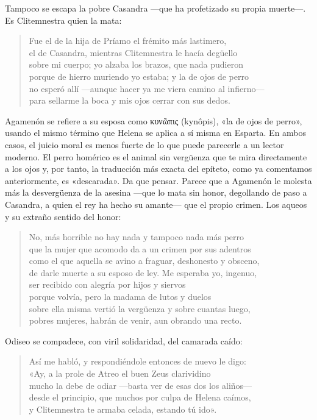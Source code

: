\documentclass[11pt,a4paper]{article}
\newcommand{\gr}[1]{\foreignlanguage{greek}{#1}}
\begin{document}
Tampoco se escapa la pobre Casandra ---que ha profetizado su propia muerte---. Es Clitemnestra quien la mata:

\begin{verse}
Fue el de la hija de Príamo el frémito más lastimero,\\
el de Casandra, mientras Clitemnestra le hacía degüello\\
sobre mi cuerpo; yo alzaba los brazos, que nada pudieron\\
porque de hierro muriendo yo estaba; y la de ojos de perro\\
no esperó allí ---aunque hacer ya me viera camino al infierno---\\
para sellarme la boca y mis ojos cerrar con sus dedos.
\end{verse}

Agamenón se refiere a su esposa como \gr{κυνῶπις} (kynôpis), «la de ojos de perro», usando el mismo término que Helena se aplica a sí misma en Esparta. En ambos casos, el juicio moral es menos fuerte de lo que puede parecerle a un lector moderno. El perro homérico es el animal sin vergüenza que te mira directamente a los ojos y, por tanto, la traducción más exacta del epíteto, como ya comentamos anteriormente, es «descarada». Da que pensar. Parece que a Agamenón le molesta más la desvergüenza de la asesina ---que lo mata sin honor, degollando de paso a Casandra, a quien el rey ha hecho su amante--- que el propio crimen. Los aqueos y su extraño sentido del honor:

\begin{verse}
No, más horrible no hay nada y tampoco nada más perro\\
que la mujer que acomodo da a un crimen por sus adentros\\
como el que aquella se avino a fraguar, deshonesto y obsceno,\\
de darle muerte a su esposo de ley. Me esperaba yo, ingenuo,\\
ser recibido con alegría por hijos y siervos\\
porque volvía, pero la madama de lutos y duelos\\
sobre ella misma vertió la vergüenza y sobre cuantas luego,\\
pobres mujeres, habrán de venir, aun obrando una recto.
\end{verse}

Odiseo se compadece, con viril solidaridad, del camarada caído:

\begin{verse}
Así me habló, y respondiéndole entonces de nuevo le digo:\\
«Ay, a la prole de Atreo el buen Zeus clarividino\\
mucho la debe de odiar ---basta ver de esas dos los aliños---\\
desde el principio, que muchos por culpa de Helena caímos,\\
y Clitemnestra te armaba celada, estando tú ido».
\end{verse}
\end{document}
